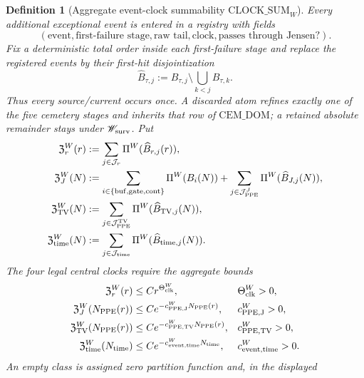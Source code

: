 \documentclass[11pt]{article}
\newtheorem{definition}[theorem]{Definition}
\begin{document}
\begin{definition}[Aggregate event-clock summability
$\mathrm{CLOCK\_SUM}_{W}$]
\label{def:aggregate-clock-summability}
Every additional exceptional event is entered in a registry with fields
\[
 (\text{event},\text{first-failure stage},\text{raw tail},
   \text{clock},\text{passes through Jensen?}).
\]
Fix a deterministic total order inside each first-failure stage and replace
the registered events by their first-hit disjointization
\begin{equation}
\label{eq:clock-first-hit-disjointization}
 \widehat B_{\tau,j}:=B_{\tau,j}\setminus
   \bigcup_{k<j}B_{\tau,k}.
\end{equation}
Thus every source/current occurs once.  A discarded atom refines exactly one
of the five cemetery stages and inherits that row of
$\mathrm{CEM\_DOM}$; a retained absolute remainder stays under
$\mathscr W_{\rm surv}$.  Put
\begin{align}
 \mathfrak Z_r^W(r)&:=
  \sum_{j\in\mathcal J_r}\Pi^W(\widehat B_{r,j}(r)),
 \label{eq:clock-partition-polynomial}\\
 \mathfrak Z_J^W(N)&:=
  \sum_{i\in\{\rm buf,gate,cont\}}\Pi^W(B_i(N))
  +\sum_{j\in\mathcal J_{\rm PPE}^{J}}
       \Pi^W(\widehat B_{J,j}(N)),
 \label{eq:clock-partition-PPE-Jensen}\\
 \mathfrak Z_{\rm TV}^W(N)&:=
  \sum_{j\in\mathcal J_{\rm PPE}^{\rm TV}}
       \Pi^W(\widehat B_{{\rm TV},j}(N)),
 \label{eq:clock-partition-PPE-TV}\\
 \mathfrak Z_{\rm time}^W(N)&:=
  \sum_{j\in\mathcal J_{\rm time}}
       \Pi^W(\widehat B_{{\rm time},j}(N)).
 \label{eq:clock-partition-time}
\end{align}
The four legal central clocks require the \emph{aggregate} bounds
\begin{align}
 \mathfrak Z_r^W(r)&\le Cr^{\Theta_{\rm clk}^{W}},
   &&\Theta_{\rm clk}^{W}>0,
   \label{eq:clock-polynomial-r}\\
 \mathfrak Z_J^W(N_{\rm PPE}(r))&\le
   Ce^{-c_{\rm PPE,J}^{W}N_{\rm PPE}(r)},
   &&c_{\rm PPE,J}^{W}>0,
   \label{eq:clock-PPE-Jensen}\\
 \mathfrak Z_{\rm TV}^W(N_{\rm PPE}(r))&\le
   Ce^{-c_{\rm PPE,TV}^{W}N_{\rm PPE}(r)},
   &&c_{\rm PPE,TV}^{W}>0,
   \label{eq:clock-PPE-TV}\\
 \mathfrak Z_{\rm time}^W(N_{\rm time})&\le
   Ce^{-c_{\rm event,time}^{W}N_{\rm time}},
   &&c_{\rm event,time}^{W}>0.
   \label{eq:clock-genuine-time}
\end{align}
An empty class is assigned zero partition function and, in the displayed

\end{definition}
\end{document}
